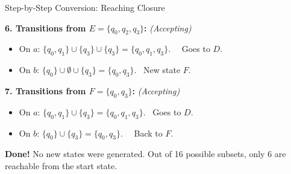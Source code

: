 \documentclass[10pt,aspectratio=169]{beamer}
\begin{document}
\begin{frame}{Step-by-Step Conversion: Reaching Closure}

\textbf{6. Transitions from $E = \{q_0, q_2, q_3\}$:} \textit{(Accepting)}
\begin{itemize}
\item On $a$: $\{q_0, q_1\} \cup \{q_3\} \cup \{q_3\} = \{q_0, q_1, q_3\}$. \quad \quad \, \textrightarrow\ Goes to $D$.
\item On $b$: $\{q_0\} \cup \emptyset \cup \{q_3\} = \{q_0, q_3\}$. \quad \quad \quad \quad \quad \textrightarrow\ New state $F$.
\end{itemize}

\vspace{1em}
\pause

\textbf{7. Transitions from $F = \{q_0, q_3\}$:} \textit{(Accepting)}
\begin{itemize}
\item On $a$: $\{q_0, q_1\} \cup \{q_3\} = \{q_0, q_1, q_3\}$. \quad \quad \quad \quad \quad \textrightarrow\ Goes to $D$.
\item On $b$: $\{q_0\} \cup \{q_3\} = \{q_0, q_3\}$. \quad \quad \quad \quad \quad \quad \quad \, \textrightarrow\ Back to $F$.
\end{itemize}

\vspace{1em}
\pause

\textbf{Done!} No new states were generated. Out of 16 possible subsets, only 6 are reachable from the start state. 

\end{frame}
\end{document}

